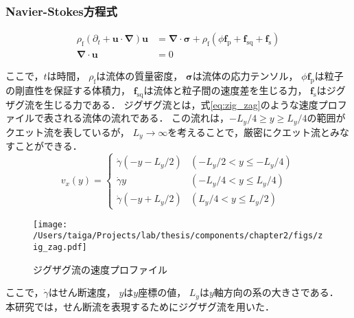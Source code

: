 \subsubsection{Navier-Stokes方程式}
    \begin{align}
        \rho_\mathrm{f} (\partial _t + \boldsymbol{u} \cdot \boldsymbol{\nabla} ) \boldsymbol{u} &= 
            \boldsymbol{\nabla} \cdot \boldsymbol{\sigma} + 
            \rho_\mathrm{f} \left( \phi \boldsymbol{f}_\mathrm{p} + \boldsymbol{f}_\mathrm{sq} + \boldsymbol{f}_\mathrm{s} \right) \\
        \boldsymbol{\nabla} \cdot \boldsymbol{u} &= 0
    \end{align}

ここで，$t$は時間，
$\rho_\mathrm{f}$は流体の質量密度，
$\boldsymbol{\sigma}$は流体の応力テンソル，
$\phi \boldsymbol{f}_\mathrm{p}$は粒子の剛直性を保証する体積力，
$\boldsymbol{f}_\mathrm{sq}$は流体と粒子間の速度差を生じる力，
$\boldsymbol{f}_\mathrm{s}$はジグザグ流を生じる力である．
ジグザグ流とは，式\eqref{eq:zig_zag}のような速度プロファイルで表される流体の流れである．
この流れは，$-L_y/4 \geq y \geq L_y/4$の範囲がクエット流を表しているが，
$L_y \rightarrow \infty$を考えることで，厳密にクエット流とみなすことができる．
    \begin{equation}
        v_x(y) =
        \begin{cases}
            \dot{\gamma} \left( - y - L_y/2 \right) & (-L_y/2 < y \leq -L_y/4) \\
            \dot{\gamma} y                          & (-L_y/4 < y \leq  L_y/4) \\
            \dot{\gamma} \left( - y + L_y/2 \right) & ( L_y/4 < y \leq  L_y/2)
        \end{cases}
        \label{eq:zig_zag}
    \end{equation}

    \begin{figure}[htbp]
        \centering
        \texttt{[image: /Users/taiga/Projects/lab/thesis/components/chapter2/figs/zig\_zag.pdf]}
        \caption{ジグザグ流の速度プロファイル}
        \label{fig:zig_zag}
    \end{figure}

\noindent
ここで，$\dot{\gamma}$はせん断速度，
$y$は$y$座標の値，
$L_y$は$y$軸方向の系の大きさである．
本研究では，せん断流を表現するためにジグザグ流を用いた．
